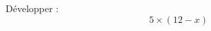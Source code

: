 
\begin{mental}
    Développer :
            \begin{equation}
                5\times (12-x)
            \end{equation}
\end{mental}
